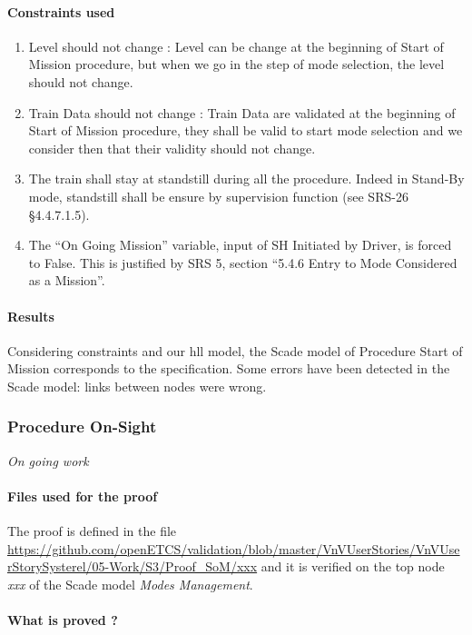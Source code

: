 \documentclass{article}
\begin{document}
\paragraph{Constraints used}
\begin{enumerate}
\item Level should not change : Level can be change at the beginning of Start of Mission procedure, but when we go in the step of mode selection, the level should not change.

\item Train Data should not change : Train Data are validated at the beginning of Start of Mission procedure, they shall be valid to start mode selection and we consider then that  their validity should not change.

\item The train shall stay at standstill during all the procedure. Indeed in Stand-By mode, standstill shall be ensure by supervision function (see SRS-26 §4.4.7.1.5).

\item The ``On Going Mission'' variable, input of SH Initiated by Driver, is
forced to False. This is justified by SRS 5, section ``5.4.6 Entry to
Mode Considered as a Mission''.
\end{enumerate}



\paragraph{Results}
Considering constraints and our hll model, the Scade model of Procedure
Start of Mission corresponds to the specification.
Some errors have been detected in the Scade model: links between nodes were wrong.

\subsubsection{Procedure On-Sight}
\emph{On going work}


\paragraph{Files used for the proof} The proof is defined in the file \url{https://github.com/openETCS/validation/blob/master/VnVUserStories/VnVUserStorySysterel/05-Work/S3/Proof_SoM/xxx} and it is verified on the top node \emph{xxx} of the Scade model \emph{Modes Management}.

\paragraph{What is proved ?}
\end{document}
